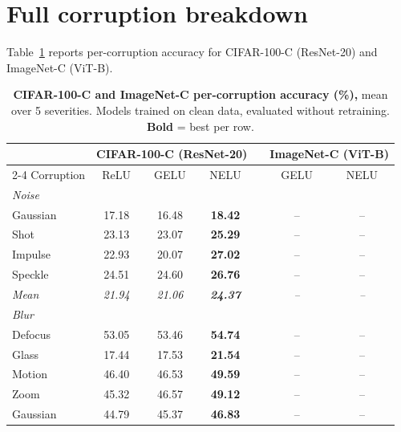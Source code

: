 \appendix

\section{Full corruption breakdown}\label{app:corruption_full}

Table~\ref{tab:corruption_full} reports per-corruption accuracy for CIFAR-100-C (ResNet-20) and ImageNet-C (ViT-B).

\begin{table}[t]
\centering
\caption{\textbf{CIFAR-100-C and ImageNet-C per-corruption accuracy (\%),} mean over 5 severities.
Models trained on clean data, evaluated without retraining. \textbf{Bold} = best per row.}
\label{tab:corruption_full}
\vspace{0.5em}
\small
\begin{tabular}{l ccc c cc}
\toprule
 & \multicolumn{3}{c}{\textbf{CIFAR-100-C} (ResNet-20)} & & \multicolumn{2}{c}{\textbf{ImageNet-C} (ViT-B)} \\
\cmidrule{2-4} \cmidrule{6-7}
Corruption & ReLU & GELU & NELU & & GELU & NELU \\
\midrule
\multicolumn{7}{l}{\textit{Noise}} \\
\quad Gaussian       & 17.18 & 16.48 & \textbf{18.42} & & -- & -- \\
\quad Shot           & 23.13 & 23.07 & \textbf{25.29} & & -- & -- \\
\quad Impulse        & 22.93 & 20.07 & \textbf{27.02} & & -- & -- \\
\quad Speckle        & 24.51 & 24.60 & \textbf{26.76} & & -- & -- \\
\rowcolor{gray!8}
\quad \textit{Mean}  & \textit{21.94} & \textit{21.06} & \textit{\textbf{24.37}} & & \textit{--} & \textit{--} \\
\midrule
\multicolumn{7}{l}{\textit{Blur}} \\
\quad Defocus        & 53.05 & 53.46 & \textbf{54.74} & & -- & -- \\
\quad Glass          & 17.44 & 17.53 & \textbf{21.54} & & -- & -- \\
\quad Motion         & 46.40 & 46.53 & \textbf{49.59} & & -- & -- \\
\quad Zoom           & 45.32 & 46.57 & \textbf{49.12} & & -- & -- \\
\quad Gaussian       & 44.79 & 45.37 & \textbf{46.83} & & -- & -- \\

\end{tabular}
\end{table}

